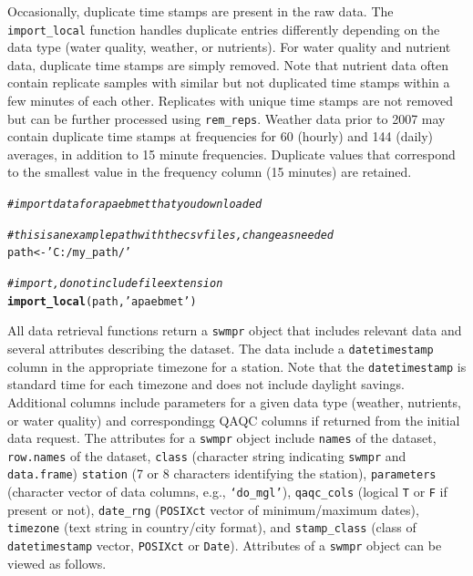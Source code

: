 \documentclass[10pt,letterpaper]{article}\usepackage[]{graphicx}\usepackage[]{color}
\makeatletter
\newcommand{\hlstr}[1]{\textcolor[rgb]{0.192,0.494,0.8}{#1}}%
\newcommand{\hlcom}[1]{\textcolor[rgb]{0.678,0.584,0.686}{\textit{#1}}}%
\newcommand{\hlstd}[1]{\textcolor[rgb]{0.345,0.345,0.345}{#1}}%
\newcommand{\hlkwb}[1]{\textcolor[rgb]{0.69,0.353,0.396}{#1}}%
\newcommand{\hlkwd}[1]{\textcolor[rgb]{0.737,0.353,0.396}{\textbf{#1}}}%
\newenvironment{kframe}{%
 \def\at@end@of@kframe{}%
 \ifinner\ifhmode%
  \def\at@end@of@kframe{\end{minipage}}%
  \begin{minipage}{\columnwidth}%
 \fi\fi%
 \def\FrameCommand##1{\hskip\@totalleftmargin \hskip-\fboxsep
 \colorbox{shadecolor}{##1}\hskip-\fboxsep
     \hskip-\linewidth \hskip-\@totalleftmargin \hskip\columnwidth}%
 \MakeFramed {\advance\hsize-\width
   \@totalleftmargin\z@ \linewidth\hsize
   \@setminipage}}%
 {\par\unskip\endMakeFramed%
 \at@end@of@kframe}
\newenvironment{knitrout}{}{} %
\makeatother
\begin{document}
Occasionally, duplicate time stamps are present in the raw data.  The \texttt{import\_local} function handles duplicate entries differently depending on the data type (water quality,  weather, or nutrients).  For water quality and nutrient data, duplicate time stamps are simply removed.  Note that nutrient data often contain replicate samples with similar but not duplicated time stamps within a few minutes of each other.  Replicates with unique time stamps are not removed but can be further processed using \texttt{rem\_reps}.  Weather data prior to 2007 may contain duplicate time stamps at frequencies for 60 (hourly) and 144 (daily) averages, in addition to 15 minute frequencies.  Duplicate values that correspond to the smallest value in the frequency column (15 minutes) are retained.  

\begin{knitrout}
\color{fgcolor}\begin{kframe}
\begin{alltt}
\hlcom{# import data for apaebmet that you downloaded}

\hlcom{# this is an example path with the csv files, change as needed}
\hlstd{path} \hlkwb{<-} \hlstr{'C:/my_path/'}

\hlcom{# import, do not include file extension}
\hlkwd{import_local}\hlstd{(path,} \hlstr{'apaebmet'}\hlstd{)}
\end{alltt}
\end{kframe}
\end{knitrout}

All data retrieval functions return a \texttt{swmpr} object that includes relevant data and several attributes describing the dataset.  The data include a \texttt{datetimestamp} column in the appropriate timezone for a station.  Note that the \texttt{datetimestamp} is standard time for each timezone and does not include daylight savings. Additional columns include parameters for a given data type (weather, nutrients, or water quality) and correspondingg \ac{QAQC} columns if returned from the initial data request.  The attributes for a \texttt{swmpr} object include \texttt{names} of the dataset, \texttt{row.names} of the dataset, \texttt{class} (character string indicating \texttt{swmpr} and \texttt{data.frame}) \texttt{station} (7 or 8 characters identifying the station),  \texttt{parameters} (character vector of data columns, e.g., \texttt{`do\_mgl'}), \texttt{qaqc\_cols} (logical \texttt{T} or \texttt{F} if present or not), \texttt{date\_rng} (\texttt{POSIXct} vector of minimum/maximum dates), \texttt{timezone} (text string in country/city format), and \texttt{stamp\_class} (class of \texttt{datetimestamp} vector, \texttt{POSIXct} or \texttt{Date}).  Attributes of a \texttt{swmpr} object can be viewed as follows.
\end{document}
